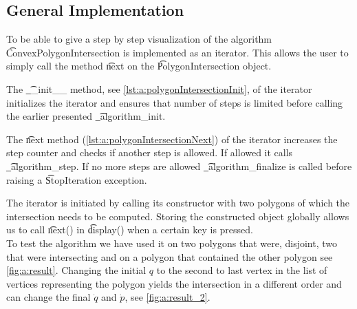 		

\subsection*{General Implementation}
	To be able to give a step by step visualization of the algorithm \t{ConvexPolygonIntersection} is implemented as an iterator. This allows the user to simply call the method \t{next} on the \t{PolygonIntersection} object. 

	The \t{__init__} method, see \autoref{lst:a:polygonIntersectionInit}, of the iterator initializes the iterator and ensures that number of steps is limited before calling the earlier presented \t{_algorithm_init}. 

	The \t{next} method (\autoref{lst:a:polygonIntersectionNext}) of the iterator increases the step counter and checks if another step is allowed. If allowed it calls \t{_algorithm_step}. If no more steps are allowed \t{_algorithm_finalize} is called before raising a \t{StopIteration} exception. 

	

	

	The iterator is initiated by calling its constructor with two polygons of which the intersection needs to be computed. Storing the constructed object globally allows us to call \t{next()} in \t{display()} when a certain key is pressed.\\

	To test the algorithm we have used it on two polygons that were, disjoint, two that were intersecting and on a polygon that contained the other polygon see \autoref{fig:a:result}. Changing the initial $q$ to the second to last vertex in the list of vertices representing the polygon yields the intersection in a different order and can change the final $\dot{q}$ and $\dot{p}$, see \autoref{fig:a:result_2}.


